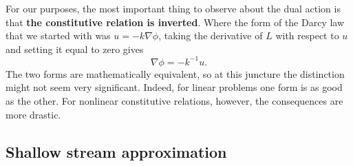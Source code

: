 \documentclass{article}
\theoremstyle{definition}
\theoremstyle{plain}
\begin{document}
For our purposes, the most important thing to observe about the dual action is that \textbf{the constitutive relation is inverted}.
Where the form of the Darcy law that we started with was $u = -k\nabla\phi$, taking the derivative of $L$ with respect to $u$ and setting it equal to zero gives
\begin{equation}
    \nabla\phi = -k^{-1}u.
\end{equation}
The two forms are mathematically equivalent, so at this juncture the distinction might not seem very significant.
Indeed, for linear problems one form is as good as the other.
For nonlinear constitutive relations, however, the consequences are more drastic.

\subsection{Shallow stream approximation}
\end{document}
